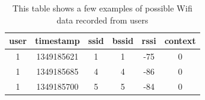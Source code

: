 \begin{table}[h] \centering
\begin{tabular}{cccccc}
\hline
\multicolumn{1}{l}{\textbf{user}} & \multicolumn{1}{l}{\textbf{timestamp}} & \multicolumn{1}{l}{\textbf{ssid}} & \multicolumn{1}{l}{\textbf{bssid}} & \multicolumn{1}{l}{\textbf{rssi}} & \multicolumn{1}{l}{\textbf{context}} \\ \hline
1                                 & 1349185621                             & 1                                 & 1                                  & -75                               & 0                                    \\
1                                 & 1349185685                             & 4                                 & 4                                  & -86                               & 0                                    \\
1                                 & 1349185700                             & 5                                 & 5                                  & -84                               & 0                                    \\ \hline
\end{tabular}
\caption{This table shows a few examples of possible Wifi data recorded from
users}
\label{tab:user_data}
\end{table}

